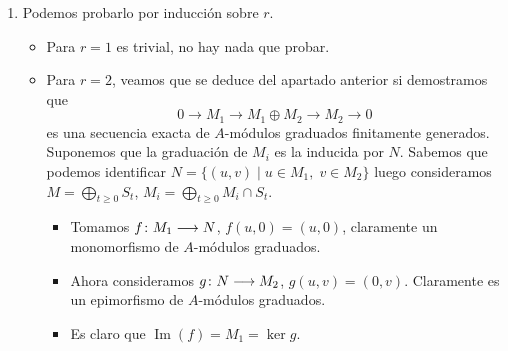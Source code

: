 \documentclass[twoside]{article}
\DeclareMathOperator{\Ima}{Im}
\begin{document}
\begin{solucion}
\begin{enumerate}
\begin{proof} Veamos que se verifican las propiedades.
\begin{itemize} 
\item $P_t,N_t$ y $M_t$ son $k$-e.v. de dimensión finita por el Lema \ref{lemma:1}.
\item Las restricciones de $f$ y $g$ a $M_t$ y $N_t$ respectivamente están bien definidas por la hipótesis de que son homomorfismos de $A$-módulos graduados (Ecuación \ref{eq:1}).
\item $f,g$ son homomorfismos de $k$-e.v. por ser homomorfismos de $A$-módulos, luego las restricciones también lo son. Además, $f$ es inyectiva por hipótesis, por lo que $f|_{M_t}$ también lo es. $g|_{N_t}$ es sobreyectiva por el Lema \ref{lemma:2}.
\item Sabemos que $\Ima(f)=\ker g$. Es claro que $\Ima(f|_{M_t})= \Ima(f)\cap N_t$. Una contención es trivial, sea $x\in \Ima(f)\cap N_t$, si no estuviese en $M_t$ podríamos razonar como en el Lema 2. Por definición, $\ker{g|_{N_t}}=\ker g \cap N_t$, luego
$$
\Ima(f|_{M_t})= \Ima(f)\cap N_t =\ker g \cap N_t = \ker{g|_{N_t}}
$$
\end{itemize}
\end{proof}
Una consecuencia inmediata del Lema \ref{lemma:3} es que $P_t \cong N_t/f(M_t)$, luego 
 $$
\dim_k(P_t) = \dim_k(N_t)-\dim_k(f(M_t)) \overset{\text{f inyectiva}}{=} \dim_k(N_t)-\dim_k(M_t)
$$
$$\phi_P(t) = \phi_N(t)-\phi_M(t) \Rightarrow \phi_N(t)=\phi_M(t)+\phi_P(t)$$
\item Podemos probarlo por inducción sobre $r$. 
\begin{itemize}
\item Para $r=1$ es trivial, no hay nada que probar. 
\item Para $r=2$, veamos que se deduce del apartado anterior si demostramos que 
$$
0\to M_1 \to M_1 \oplus M_2 \to M_2 \to 0$$
es una secuencia exacta de $A$-módulos graduados finitamente generados. Suponemos que la graduación de $M_i$ es la inducida por $N$. Sabemos que podemos identificar $N = \{(u,v)\mid u\in M_1,\;v\in M_2\}$ luego consideramos $M=\bigoplus_{t\geq 0} S_t$, $M_i = \bigoplus_{t\geq 0} M_i \cap S_t$.
\begin{itemize}
\item Tomamos $f\colon{M_1}\longrightarrow{N}$, $f(u,0)=(u,0)$, claramente un monomorfismo de $A$-módulos graduados. 
\item Ahora consideramos $g\colon{N}\longrightarrow{M_2}$, $g(u,v)=(0,v)$. Claramente es un epimorfismo de $A$-módulos graduados. 
\item Es claro que $\Ima(f)=M_1 = \ker g$.

\end{itemize}
\end{itemize}
\end{enumerate}
\end{solucion}
\end{document}
